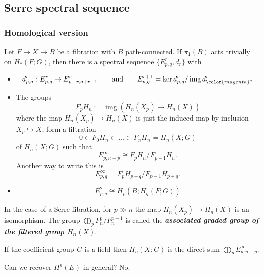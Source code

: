 \subsection*{Serre spectral sequence}

\subsubsection{Homological version}

\begin{thm}
	Let $F\to X\to B$ be a fibration with $B$ path-connected. If $\pi_1(B)$ acts trivially on $H_*(F;G)$, then there is a spectral sequence $\{E^r_{p,q},d_r\}$ with
	\begin{itemize}
		\item
			\[d^r_{p,q}:E^r_{p,q}\to E^r_{p-r,q+r-1}\qquad \text{and} \qquad E^{r+1}_{p,q}=\operatorname{ker} d^r_{p,q}/\operatorname{img} d^r_{{\color{magenta}?}}\]
		\item The groups
			\[F_pH_n:=\operatorname{img}(H_n(X_p)\to H_n(X))\]
		where the map $H_{n}(X_p)\to H_{n}(X)$ is just the induced map by inclusion $X_p\hookrightarrow X$, form a filtration
		\[0\subset F_0H_n\subset \ldots\subset F_nH_n=H_n(X;G)\]
		of $H_n(X;G)$ such that
		\[E^\infty_{p,n-p}\cong F_pH_n/F_{p-1}H_n.\]
		Another way to write this is
		\[E_{p,q}^\infty=F_pH_{p+q}\Big/F_{p-1}H_{p+q}.\]
	\item \[E^2_{p,q}\cong H_p(B;H_q(F;G))\]
\end{itemize}
\end{thm}

\begin{remark}
	In the case of a Serre fibration, for $p\gg n$ the map $H_{n}(X_p)\to H_{n}(X)$ is an isomorphism. The group $\bigoplus_{p}F^p_n/F^{p-1}_n$ is called the \textit{\textbf{associated graded group of the filtered group $H_n(X)$}}.
\end{remark}

\begin{remark}
	If the coefficient group $G$ is a field then $H_{n}(X;G)$ is the direct sum $\bigoplus_{p} E^\infty_{p,n-p}$.
\end{remark}

\begin{question}
	Can we recover $H^{n}(E)$ in general? No.
\end{question}

